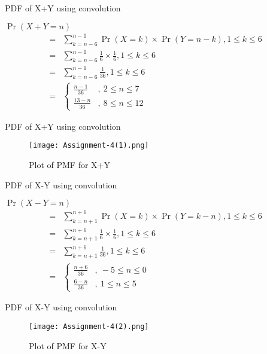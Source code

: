 \documentclass{beamer}
\providecommand{\brak}[1]{\ensuremath{\left(#1\right)}}
\begin{document}
\begin{frame}{PDF of X+Y using convolution}
    \begin{block}{}
        $\Pr\brak{X+Y=n}$
        \begin{align}
            =&\sum_{k=n-6}^{n-1} \Pr\brak{X=k}\times\Pr\brak{Y=n-k}, 1\leq k \leq 6\\
            =&\sum_{k=n-6}^{n-1} \frac{1}{6}\times\frac{1}{6}, 1\leq k \leq 6\\
            =&\sum_{k=n-6}^{n-1} \frac{1}{36}, 1\leq k \leq 6\label{0.0.12}\\
            =&
            \left\{
	        \begin{array}{ll}
		        \frac{n-1}{36}  & ,\: 2 \leq n \leq 7 \\
		        \frac{13-n}{36} & ,\: 8 \leq n \leq 12
	        \end{array}
            \right.
        \end{align}
    \end{block}
\end{frame}
\begin{frame}{PDF of X+Y using convolution}
    \begin{figure}[htb]
        \texttt{[image: Assignment-4(1).png]}
        \caption{Plot of PMF for X+Y}
    \end{figure}
\end{frame}
\begin{frame}{PDF of X-Y using convolution}
    \begin{block}{}
        $\Pr\brak{X-Y=n}$
        \begin{align}
            =&\sum_{k=n+1}^{n+6} \Pr\brak{X=k}\times\Pr\brak{Y=k-n}, 1\leq k \leq 6\\
            =&\sum_{k=n+1}^{n+6} \frac{1}{6}\times\frac{1}{6}, 1\leq k \leq 6\\
            =&\sum_{k=n+1}^{n+6} \frac{1}{36}, 1\leq k \leq 6\label{0.0.16}\\
            =&
            \left\{
	        \begin{array}{ll}
		        \frac{n+6}{36} & ,\: -5 \leq n \leq 0 \\
		        \frac{6-n}{36} & ,\: 1  \leq n \leq 5
	        \end{array}
            \right.
        \end{align}
    \end{block}
\end{frame}
\begin{frame}{PDF of X-Y using convolution}
    \begin{figure}[htb]
        \texttt{[image: Assignment-4(2).png]}
        \caption{Plot of PMF for X-Y}
    \end{figure}
\end{frame}
\end{document}
